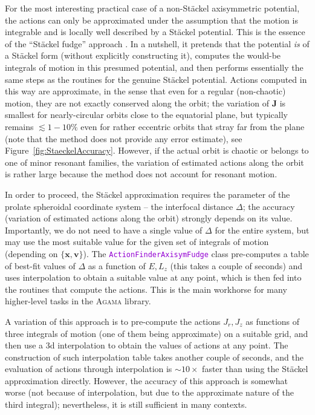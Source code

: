 \documentclass[12pt]{article}
\newcommand{\Agama}{\textsc{Agama}\xspace}
\newcommand{\ttt}[1]{\textcolor{darkviolet}{\texttt{#1}}}
\newcommand{\bv}{\boldsymbol{v}}
\newcommand{\bx}{\boldsymbol{x}}
\newcommand{\bJ}{\boldsymbol{J}}
\begin{document}
For the most interesting practical case of a non-St\"ackel axisymmetric potential, the actions can only be approximated under the assumption that the motion is integrable and is locally well described by a St\"ackel potential. This is the essence of the ``St\"ackel fudge'' approach \cite{Binney2012}. In a nutshell, it pretends that the potential \textit{is} of a St\"ackel form (without explicitly constructing it), computes the would-be integrals of motion in this presumed potential, and then performs essentially the same steps as the routines for the genuine St\"ackel potential. Actions computed in this way are approximate, in the sense that even for a regular (non-chaotic) motion, they are not exactly conserved along the orbit; the variation of $\bJ$ is smallest for nearly-circular orbits close to the equatorial plane, but typically remains $\lesssim 1-10\%$ even for rather eccentric orbits that stray far from the plane (note that the method does not provide any error estimate), see Figure~\ref{fig:StaeckelAccuracy}. However, if the actual orbit is chaotic or belongs to one of minor resonant families, the variation of estimated actions along the orbit is rather large because the method does not account for resonant motion.

In order to proceed, the St\"ackel approximation requires the parameter of the prolate spheroidal coordinate system -- the interfocal distance $\Delta$; the accuracy (variation of estimated actions along the orbit) strongly depends on its value. Importantly, we do not need to have a single value of $\Delta$ for the entire system, but may use the most suitable value for the given set of integrals of motion (depending on $\{\bx,\bv\}$).
The \ttt{ActionFinderAxisymFudge} class pre-computes a table of best-fit values of $\Delta$ as a function of $E,L_z$ (this takes a couple of seconds) and uses interpolation to obtain a suitable value at any point, which is then fed into the routines that compute the actions.
This is the main workhorse for many higher-level tasks in the \Agama library.

A variation of this approach is to pre-compute the actions $J_r,J_z$ as functions of three integrals of motion (one of them being approximate) on a suitable grid, and then use a 3d interpolation to obtain the values of actions at any point. The construction of such interpolation table takes another couple of seconds, and the evaluation of actions through interpolation is $\sim 10\times$ faster than using the St\"ackel approximation directly. However, the accuracy of this approach is somewhat worse (not because of interpolation, but due to the approximate nature of the third integral); nevertheless, it is still sufficient in many contexts.
\end{document}
